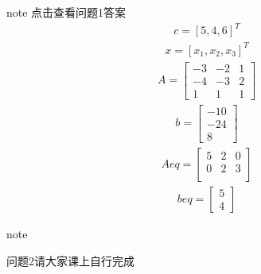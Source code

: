 \documentclass[letterpaper,10pt,english]{sphinxmanual}
\begin{document}
\begin{sphinxadmonition}{note}{ 点击查看问题1答案}
\begin{equation*}
\begin{split}
c = [5,4,6]^T
\end{split}
\end{equation*}\begin{equation*}
\begin{split}
x = [x_1,x_2,x_3]^T
\end{split}
\end{equation*}\begin{equation*}
\begin{split}
A = \left[\begin{matrix} -3 & -2 & 1 \\ 
-4 & -3 & 2\\
1 & 1 & 1
\end{matrix} \right]
\end{split}
\end{equation*}\begin{equation*}
\begin{split}
b = \left[\begin{matrix} -10 \\ 
-24 \\
8
\end{matrix} \right] 
\end{split}
\end{equation*}\begin{equation*}
\begin{split}
Aeq = \left[\begin{matrix} 5 & 2 & 0 \\ 
0 & 2 & 3\\
\end{matrix} \right]
\end{split}
\end{equation*}\begin{equation*}
\begin{split}
beq = \left[\begin{matrix} 5 \\ 
4 
\end{matrix} \right] 
\end{split}
\end{equation*}
\begin{sphinxadmonition}{note}{}

问题2请大家课上自行完成
\end{sphinxadmonition}
\end{sphinxadmonition}
\end{document}
